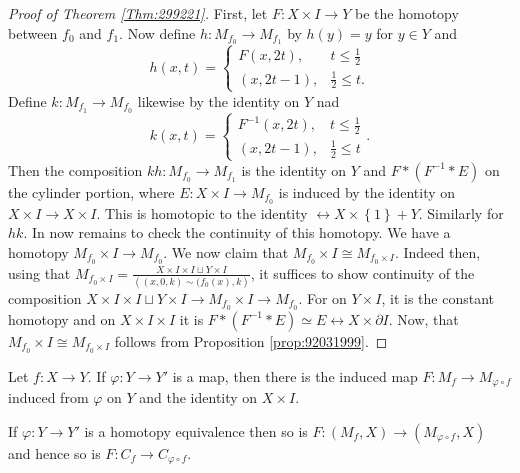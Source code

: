 \begin{proof}[Proof of Theorem \ref{Thm:299221}]
    First, let $F \colon X \times I \to Y$ be the homotopy
    between $f_0$ and $f_1$. Now define $h \colon
    M_{f_0} \to M_{f_1}$ by $h(y) = y$ for
    $y \in Y$ and
    \[
    h\left( x,t \right) = 
    \begin{cases}
        F\left( x,2t \right) ,& t\le \frac{1}{2}\\
        (x, 2t-1),& \frac{1}{2} \le t.
    \end{cases}
    \] 
    Define
    $k \colon M_{f_1} \to M_{f_0}$ likewise by
    the identity on $Y$ nad
    \[
    k\left( x,t \right) =
    \begin{cases}
        F^{-1}\left( x,2t \right) ,& t\le \frac{1}{2}\\
        (x,2t-1),& \frac{1}{2}\le t
    \end{cases}.
    \] 
    Then the composition
    $kh \colon M_{f_0} \to M_{f_1}$ is the identity
    on $Y$ and 
    $F * \left( F^{-1} * E \right) $ on
    the cylinder portion, where $E \colon X \times I \to 
    M_{f_0}$ is induced by the identity on
    $X \times I \to X \times I$.
    This is homotopic to the identity 
    $\rel X \times \left\{ 1 \right\} + Y$.
    Similarly for $hk$.
    In now remains to check the continuity of this homotopy.
    We have a homotopy $M_{f_0} \times I \to 
    M_{f_0}$. We now claim that
    $M_{f_0} \times I \cong M_{f_0 \times I}$. Indeed
    then, using that
    $M_{f_0 \times I} = 
    \frac{X \times I \times I \sqcup Y \times I}{
    \left( (x,0,k) \sim (f_0(x),k \right) }$, it suffices
    to show continuity of the composition
    $X \times I \times I \sqcup Y \times I
    \to M_{f_0} \times I \to M_{f_0}$. 
    For on $Y \times I$, it is the constant homotopy and
    on $X \times I \times I$ it is
    $F * \left( F^{-1} * E \right) \simeq E
    \rel X \times \partial I$. 
    Now, that $M _{f_0} \times I
    \cong M_{f_0 \times I}$ follows from
    Proposition \ref{prop:92031999}.

\end{proof}

Let $f \colon X \to Y$. If $\varphi  \colon Y \to Y'$ is a map,
then there is the induced map
$F \colon M_{f} \to M_{\varphi \circ f}$ induced from
$\varphi $ on $Y$ and the identity on $X \times I$.

\begin{theorem}[]
    If $\varphi  \colon Y \to Y'$ is a homotopy equivalence
    then so is 
    $F \colon \left( M_f , X \right) \to 
    \left( M_{\varphi  \circ f}, X \right) $ and hence
    so is $F \colon C_f \to C_{\varphi  \circ f}$.
\end{theorem}

